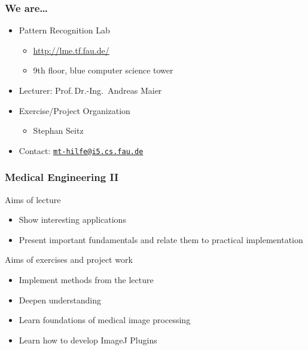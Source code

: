 

\subtitle{Motivation}




\nocite{*}

\frame[plain,c]{\titlepage} %

\begin{frame}
	\frametitle{We are\ldots}
	\begin{itemize}
		\setlength\itemsep{0.5cm}
		\item Pattern Recognition Lab
		      \begin{itemize}
			      \item \url{http://lme.tf.fau.de/}
			      \item 9th floor, blue computer science tower
		      \end{itemize}
		\item Lecturer: Prof.\,Dr.-Ing.\ Andreas Maier
		\item Exercise/Project Organization
		      \begin{itemize}
			      \item Stephan Seitz
		      \end{itemize}
		\item Contact: \texttt{\href{mailto:mt-hilfe@i5.cs.fau.de}{mt-hilfe@i5.cs.fau.de}}
	\end{itemize}
\end{frame}

\begin{frame}
	\frametitle{Medical Engineering II}
	\begin{block}{Aims of lecture}
		\begin{itemize}
			\item Show interesting applications
			\item Present important fundamentals and relate them to practical
			      implementation
		\end{itemize}
	\end{block}
	\begin{block}{Aims of exercises and project work}
		\begin{itemize}
			\item Implement methods from the lecture
			\item Deepen understanding
			\item Learn foundations of medical image processing
			\item Learn how to develop ImageJ Plugins
		\end{itemize}
	\end{block}
\end{frame}

